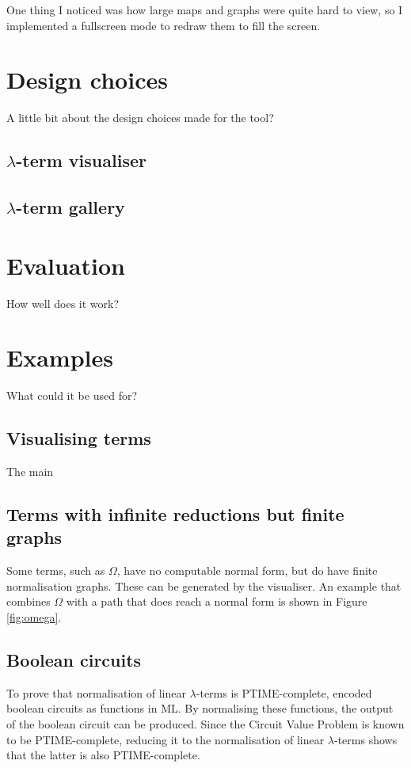 \documentclass[11pt]{article}
\begin{document}
One thing I noticed was how large maps and graphs were quite hard to view, so I implemented a fullscreen mode to redraw them to fill the screen.

\newpage

\section{Design choices}
\label{sec:design}
A little bit about the design choices made for the tool?

\subsection{\texorpdfstring{$\lambda$}{Lambda}-term visualiser}


\subsection{\texorpdfstring{$\lambda$}{Lambda}-term gallery}


\newpage
\section{Evaluation}
\label{sec:evaluation}
How well does it work?

\newpage
\section{Examples}
What could it be used for?

\subsection{Visualising terms}
The main 

\subsection{Terms with infinite reductions but finite graphs}
Some terms, such as $\Omega$, have no computable normal form, but do have finite normalisation graphs. These can be generated by the visualiser. An example that combines $\Omega$ with a path that does reach a normal form is shown in Figure \ref{fig:omega}.

\subsection{Boolean circuits}
To prove that normalisation of linear $\lambda$-terms is PTIME-complete, \cite{mairson} encoded boolean circuits as functions in \textsc{ML}. By normalising these functions, the output of the boolean circuit can be produced. Since the Circuit Value Problem is known to be PTIME-complete, reducing it to the normalisation of linear $\lambda$-terms shows that the latter is also PTIME-complete.
\end{document}
